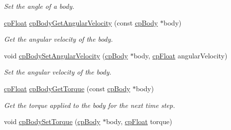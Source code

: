 \begin{DoxyCompactItemize}
\begin{DoxyCompactList}\small\item\em Set the angle of a body. \end{DoxyCompactList}\item 
\hypertarget{group__cp_body_gadfbc3e83930435d6d335d0dd59d88d10}{}\hyperlink{group__basic_types_gac1ed65573e035bf892505768c852d8d3}{cp\+Float} \hyperlink{group__cp_body_gadfbc3e83930435d6d335d0dd59d88d10}{cp\+Body\+Get\+Angular\+Velocity} (const \hyperlink{structcp_body}{cp\+Body} $\ast$body)\label{group__cp_body_gadfbc3e83930435d6d335d0dd59d88d10}

\begin{DoxyCompactList}\small\item\em Get the angular velocity of the body. \end{DoxyCompactList}\item 
\hypertarget{group__cp_body_ga478dd302a5e3114dc0ad9dc9bf80197f}{}void \hyperlink{group__cp_body_ga478dd302a5e3114dc0ad9dc9bf80197f}{cp\+Body\+Set\+Angular\+Velocity} (\hyperlink{structcp_body}{cp\+Body} $\ast$body, \hyperlink{group__basic_types_gac1ed65573e035bf892505768c852d8d3}{cp\+Float} angular\+Velocity)\label{group__cp_body_ga478dd302a5e3114dc0ad9dc9bf80197f}

\begin{DoxyCompactList}\small\item\em Set the angular velocity of the body. \end{DoxyCompactList}\item 
\hypertarget{group__cp_body_ga1a7f073b78f186bd7f69d5edad30ec02}{}\hyperlink{group__basic_types_gac1ed65573e035bf892505768c852d8d3}{cp\+Float} \hyperlink{group__cp_body_ga1a7f073b78f186bd7f69d5edad30ec02}{cp\+Body\+Get\+Torque} (const \hyperlink{structcp_body}{cp\+Body} $\ast$body)\label{group__cp_body_ga1a7f073b78f186bd7f69d5edad30ec02}

\begin{DoxyCompactList}\small\item\em Get the torque applied to the body for the next time step. \end{DoxyCompactList}\item 
\hypertarget{group__cp_body_gaecbe740059acd16e7669aa171724efac}{}void \hyperlink{group__cp_body_gaecbe740059acd16e7669aa171724efac}{cp\+Body\+Set\+Torque} (\hyperlink{structcp_body}{cp\+Body} $\ast$body, \hyperlink{group__basic_types_gac1ed65573e035bf892505768c852d8d3}{cp\+Float} torque)\label{group__cp_body_gaecbe740059acd16e7669aa171724efac}


\end{DoxyCompactItemize}
